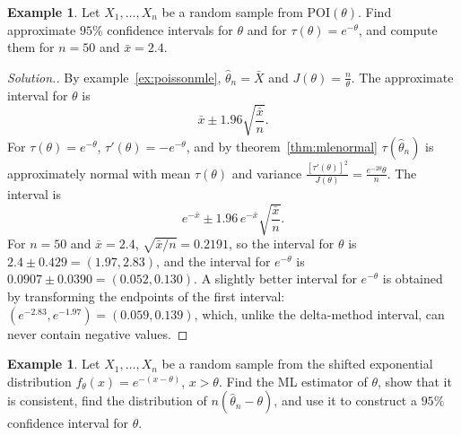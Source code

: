 \documentclass[12pt,a4paper]{report}
\theoremstyle{definition}
\newtheorem{exa}[thm]{Example}
\newenvironment{solution}
  {\renewcommand{\qedsymbol}{}\begin{proof}[\textit{Solution}.]}
  {\end{proof}}
\begin{document}
\begin{exa}
\label{ex:poissonci}
Let $X_1, \dots, X_n$ be a random sample from $\text{POI}(\theta)$. Find approximate
$95\%$ confidence intervals for $\theta$ and for $\tau(\theta) = e^{-\theta}$, and compute
them for $n = 50$ and $\bar x = 2.4$.
\end{exa}

\begin{solution}
By example~\ref{ex:poissonmle}, $\hat\theta_n = \bar X$ and $J(\theta) = \frac n\theta$. The
approximate interval for $\theta$ is
\[\bar x\pm 1.96\sqrt{\frac{\bar x}{n}} .\]
For $\tau(\theta) = e^{-\theta}$, $\tau'(\theta) = -e^{-\theta}$, and by
theorem~\ref{thm:mlenormal} $\tau(\hat\theta_n)$ is approximately normal with mean
$\tau(\theta)$ and variance $\frac{[\tau'(\theta)]^2}{J(\theta)} = \frac{e^{-2\theta}\theta}{n}$.
The interval is
\[e^{-\bar x}\pm 1.96\,e^{-\bar x}\sqrt{\frac{\bar x}{n}} .\]
For $n = 50$ and $\bar x = 2.4$, $\sqrt{\bar x/n} = 0.2191$, so the interval for
$\theta$ is $2.4\pm 0.429 = (1.97, 2.83)$, and the interval for $e^{-\theta}$ is
$0.0907\pm 0.0390 = (0.052, 0.130)$. A slightly better interval for $e^{-\theta}$ is
obtained by transforming the endpoints of the first interval:
$(e^{-2.83}, e^{-1.97}) = (0.059, 0.139)$, which, unlike the delta-method interval,
can never contain negative values.
\end{solution}

\begin{exa}
\label{ex:shiftedexp}
Let $X_1, \dots, X_n$ be a random sample from the shifted exponential distribution
$f_\theta(x) = e^{-(x - \theta)}$, $x>\theta$. Find the ML estimator of $\theta$, show that
it is consistent, find the distribution of $n(\hat\theta_n - \theta)$, and use it to
construct a $95\%$ confidence interval for $\theta$.
\end{exa}
\end{document}
